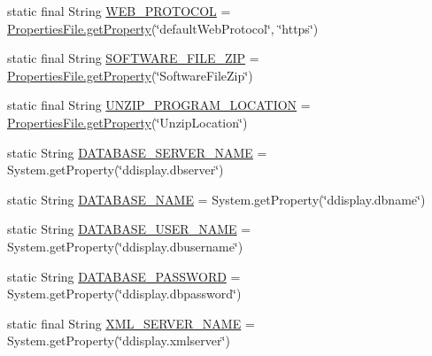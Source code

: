 \begin{DoxyCompactItemize}
\item 
static final String \hyperlink{classgov_1_1fnal_1_1ppd_1_1dd_1_1GlobalVariables_aa3bf05d555f0c3489c60664ae54a2480}{W\-E\-B\-\_\-\-P\-R\-O\-T\-O\-C\-O\-L} = \hyperlink{classgov_1_1fnal_1_1ppd_1_1dd_1_1util_1_1PropertiesFile_a72138f25e2d2cc91abfe8ce18b5d2eb3}{Properties\-File.\-get\-Property}(\char`\"{}default\-Web\-Protocol\char`\"{}, \char`\"{}https\char`\"{})
\item 
static final String \hyperlink{classgov_1_1fnal_1_1ppd_1_1dd_1_1GlobalVariables_ab8e56e6480b2c30248d2e20aee782cb4}{S\-O\-F\-T\-W\-A\-R\-E\-\_\-\-F\-I\-L\-E\-\_\-\-Z\-I\-P} = \hyperlink{classgov_1_1fnal_1_1ppd_1_1dd_1_1util_1_1PropertiesFile_a72138f25e2d2cc91abfe8ce18b5d2eb3}{Properties\-File.\-get\-Property}(\char`\"{}Software\-File\-Zip\char`\"{})
\item 
static final String \hyperlink{classgov_1_1fnal_1_1ppd_1_1dd_1_1GlobalVariables_a3b3484a9eaa4099af2a1ade1fa0f94a5}{U\-N\-Z\-I\-P\-\_\-\-P\-R\-O\-G\-R\-A\-M\-\_\-\-L\-O\-C\-A\-T\-I\-O\-N} = \hyperlink{classgov_1_1fnal_1_1ppd_1_1dd_1_1util_1_1PropertiesFile_a72138f25e2d2cc91abfe8ce18b5d2eb3}{Properties\-File.\-get\-Property}(\char`\"{}Unzip\-Location\char`\"{})
\item 
static String \hyperlink{classgov_1_1fnal_1_1ppd_1_1dd_1_1GlobalVariables_a84bb07dcee9c961579282f50a5031c0e}{D\-A\-T\-A\-B\-A\-S\-E\-\_\-\-S\-E\-R\-V\-E\-R\-\_\-\-N\-A\-M\-E} = System.\-get\-Property(\char`\"{}ddisplay.\-dbserver\char`\"{})
\item 
static String \hyperlink{classgov_1_1fnal_1_1ppd_1_1dd_1_1GlobalVariables_a737045676a15c469e5cb486d80c08043}{D\-A\-T\-A\-B\-A\-S\-E\-\_\-\-N\-A\-M\-E} = System.\-get\-Property(\char`\"{}ddisplay.\-dbname\char`\"{})
\item 
static String \hyperlink{classgov_1_1fnal_1_1ppd_1_1dd_1_1GlobalVariables_a1b5c1519d1964bf42b3fe4908ae6d444}{D\-A\-T\-A\-B\-A\-S\-E\-\_\-\-U\-S\-E\-R\-\_\-\-N\-A\-M\-E} = System.\-get\-Property(\char`\"{}ddisplay.\-dbusername\char`\"{})
\item 
static String \hyperlink{classgov_1_1fnal_1_1ppd_1_1dd_1_1GlobalVariables_ae63bd973c9c02683b0c4964179ceefe0}{D\-A\-T\-A\-B\-A\-S\-E\-\_\-\-P\-A\-S\-S\-W\-O\-R\-D} = System.\-get\-Property(\char`\"{}ddisplay.\-dbpassword\char`\"{})
\item 
static final String \hyperlink{classgov_1_1fnal_1_1ppd_1_1dd_1_1GlobalVariables_a1b1eb1c9096380d09b968cd474e8bb86}{X\-M\-L\-\_\-\-S\-E\-R\-V\-E\-R\-\_\-\-N\-A\-M\-E} = System.\-get\-Property(\char`\"{}ddisplay.\-xmlserver\char`\"{})

\end{DoxyCompactItemize}
